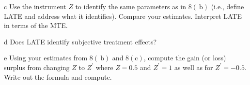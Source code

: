 \documentclass{article}
\begin{document}
\begin{problem}{c}
Use the instrument $Z$ to identify the same parameters as in $8(\mathrm{~b})$ (i.e., define LATE and address what it identifies). Compare your estimates. Interpret LATE in terms of the MTE.
\end{problem}
\begin{solution}
\end{solution}

\begin{problem}{d}
Does LATE identify subjective treatment effects?
\end{problem}
\begin{solution}
\end{solution}

\begin{problem}{e}
Using your estimates from $8(\mathrm{~b})$ and $8(\mathrm{c})$, compute the gain (or loss) surplus from changing $Z$ to $Z^{\prime}$ where $Z=0.5$ and $Z^{\prime}=1$ as well as for $Z^{\prime}=-0.5$. Write out the formula and compute.
\end{problem}
\begin{solution}
\end{solution}
\end{document}
